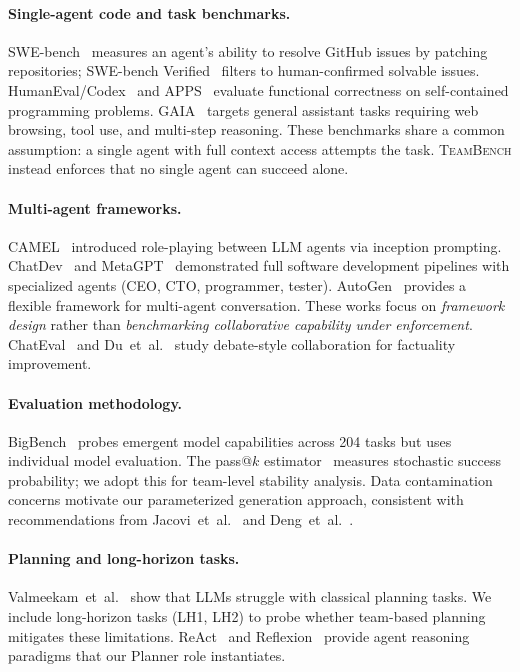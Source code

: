 \documentclass{article}
\newcommand{\teambench}{\textsc{TeamBench}}
\begin{document}
\paragraph{Single-agent code and task benchmarks.}
SWE-bench~\cite{jimenez2024swebench} measures an agent's ability to resolve
GitHub issues by patching repositories; SWE-bench
Verified~\cite{yang2024swebenchverified} filters to human-confirmed solvable
issues. HumanEval/Codex~\cite{chen2021codex} and
APPS~\cite{hendrycks2021apps} evaluate functional correctness on
self-contained programming problems. GAIA~\cite{mialon2023gaia} targets
general assistant tasks requiring web browsing, tool use, and multi-step
reasoning. These benchmarks share a common assumption: a single agent with
full context access attempts the task. \teambench{} instead enforces that no
single agent can succeed alone.

\paragraph{Multi-agent frameworks.}
CAMEL~\cite{li2023camel} introduced role-playing between LLM agents via
inception prompting. ChatDev~\cite{qian2023chatdev} and
MetaGPT~\cite{hong2023metagpt} demonstrated full software development
pipelines with specialized agents (CEO, CTO, programmer, tester). AutoGen~\cite{wu2023autogen}
provides a flexible framework for multi-agent conversation. These works focus
on \emph{framework design} rather than \emph{benchmarking collaborative
capability under enforcement}. ChatEval~\cite{chan2023chateval} and
Du~et~al.~\cite{du2023improving} study debate-style collaboration for
factuality improvement.

\paragraph{Evaluation methodology.}
BigBench~\cite{srivastava2022bigbench} probes emergent model capabilities
across 204 tasks but uses individual model evaluation. The pass@$k$
estimator~\cite{chen2021codex} measures stochastic success probability; we
adopt this for team-level stability analysis. Data contamination concerns
motivate our parameterized generation approach, consistent with
recommendations from Jacovi~et~al.~\cite{jacovi2023stop} and
Deng~et~al.~\cite{deng2024investigating}.

\paragraph{Planning and long-horizon tasks.}
Valmeekam~et~al.~\cite{valmeekam2022large} show that LLMs struggle with
classical planning tasks. We include long-horizon tasks (LH1, LH2) to probe
whether team-based planning mitigates these limitations. ReAct~\cite{yao2023react}
and Reflexion~\cite{shinn2023reflexion} provide agent reasoning paradigms that
our Planner role instantiates.
\end{document}
